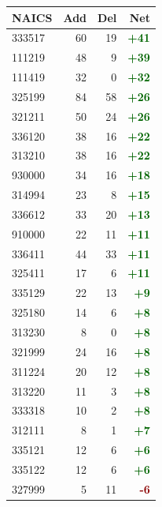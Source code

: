 \documentclass[11pt]{article}
\begin{document}
\begin{table}[H]
\centering
\begin{minipage}{0.48\textwidth}
\centering
{}
\begin{tabular}{lrrr}
\toprule
\textbf{NAICS} & \textbf{Add} & \textbf{Del} & \textbf{Net} \\
\midrule
333517 & 60 & 19 & \textcolor{darkgreen}{\textbf{+41}} \\
111219 & 48 & 9 & \textcolor{darkgreen}{\textbf{+39}} \\
111419 & 32 & 0 & \textcolor{darkgreen}{\textbf{+32}} \\
325199 & 84 & 58 & \textcolor{darkgreen}{\textbf{+26}} \\
321211 & 50 & 24 & \textcolor{darkgreen}{\textbf{+26}} \\
336120 & 38 & 16 & \textcolor{darkgreen}{\textbf{+22}} \\
313210 & 38 & 16 & \textcolor{darkgreen}{\textbf{+22}} \\
930000 & 34 & 16 & \textcolor{darkgreen}{\textbf{+18}} \\
314994 & 23 & 8 & \textcolor{darkgreen}{\textbf{+15}} \\
336612 & 33 & 20 & \textcolor{darkgreen}{\textbf{+13}} \\
910000 & 22 & 11 & \textcolor{darkgreen}{\textbf{+11}} \\
336411 & 44 & 33 & \textcolor{darkgreen}{\textbf{+11}} \\
325411 & 17 & 6 & \textcolor{darkgreen}{\textbf{+11}} \\
335129 & 22 & 13 & \textcolor{darkgreen}{\textbf{+9}} \\
325180 & 14 & 6 & \textcolor{darkgreen}{\textbf{+8}} \\
313230 & 8 & 0 & \textcolor{darkgreen}{\textbf{+8}} \\
321999 & 24 & 16 & \textcolor{darkgreen}{\textbf{+8}} \\
311224 & 20 & 12 & \textcolor{darkgreen}{\textbf{+8}} \\
313220 & 11 & 3 & \textcolor{darkgreen}{\textbf{+8}} \\
333318 & 10 & 2 & \textcolor{darkgreen}{\textbf{+8}} \\
312111 & 8 & 1 & \textcolor{darkgreen}{\textbf{+7}} \\
335121 & 12 & 6 & \textcolor{darkgreen}{\textbf{+6}} \\
335122 & 12 & 6 & \textcolor{darkgreen}{\textbf{+6}} \\
327999 & 5 & 11 & \textcolor{darkred}{\textbf{-6}} \\

\end{tabular}
\end{minipage}
\end{table}
\end{document}
